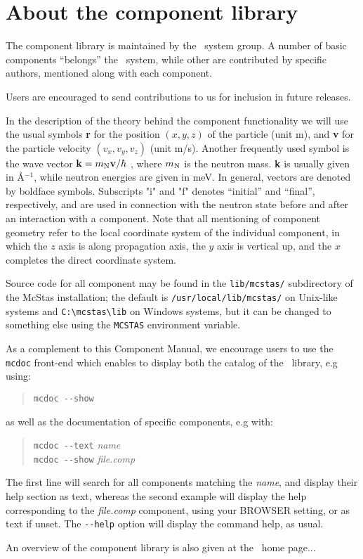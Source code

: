 
\chapter{About the component library}
\label{c:components}
The component library is
maintained by the \MCS\ system group. A number of basic components 
``belongs'' the \MCS\ system, while other are contributed
by specific authors, mentioned  along with each component.

Users are encouraged to send
contributions to us for inclusion in future releases.

In the description of the theory behind the component functionality 
we will use the usual symbols {\bf r} for the position 
$(x,y,z)$ of the particle (unit m), and {\bf v} for 
the particle velocity $(v_x, v_y, v_z)$ (unit m/s).
Another frequently used symbol is 
the wave vector ${\bf k} = m_{\rm N} {\bf v}/\hbar$ , where
$m_{\rm N}$ is the neutron mass. {\bf k} is usually given in
\AA$^{-1}$, while neutron energies are given in meV.
In general, vectors are denoted by boldface symbols.
Subscripts "i" and "f" denotes ``initial'' and ``final'', respectively,
and are used in connection with the neutron state before and after
an interaction with a component.
Note that all mentioning of component geometry refer to
the local coordinate system of the individual component, in which the $z$ axis is along propagation axis, the $y$ axis is vertical up, and the $x$ completes the direct coordinate system.

Source code for all component may be found in the \verb+lib/mcstas/+
subdirectory of the McStas installation; 
the default is \verb+/usr/local/lib/mcstas/+ on Unix-like systems and \verb+C:\mcstas\lib+ on Windows systems, but it can be
changed to something else using the \verb+MCSTAS+ environment variable. 

As a complement to this Component Manual, we encourage users to use
the \verb+mcdoc+ front-end which enables to display both the 
catalog of the \MCS\ library, e.g using: 
\begin{quote}
  \verb|mcdoc --show|
\end{quote}
as well as the documentation of specific components, e.g with:
\begin{quote}
  \verb|mcdoc --text| {\it name} \\
  \verb|mcdoc --show| {\it file.comp}
\end{quote}
The first line will search for all components matching the {\it name}, and display their help section as text, whereas the second example will display the help corresponding to the {\it file.comp} component, using your BROWSER setting, or as text if unset. The \verb+--help+ option will display the command help, as usual.

An overview of the component library is also given at the \MCS\ home page...









